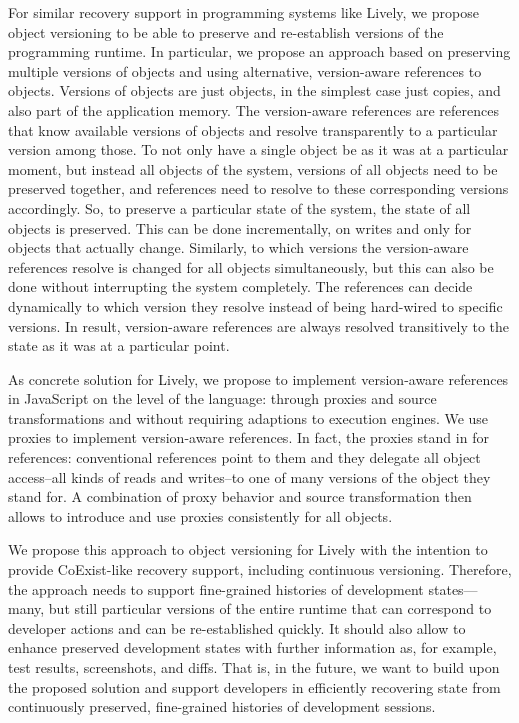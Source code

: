 For similar recovery support in programming systems like Lively, we propose object versioning to be able to preserve and re-establish versions of the programming runtime.
In particular, we propose an approach based on preserving multiple versions of objects and using alternative, version-aware references to objects.
Versions of objects are just objects, in the simplest case just copies, and also part of the application memory.
The version-aware references are references that know available versions of objects and resolve transparently to a particular version among those.
To not only have a single object be as it was at a particular moment, but instead all objects of the system, versions of all objects need to be preserved together, and references need to resolve to these corresponding versions accordingly.
So, to preserve a particular state of the system, the state of all objects is preserved.
This can be done incrementally, on writes and only for objects that actually change.
Similarly, to which versions the version-aware references resolve is changed for all objects simultaneously, but this can also be done without interrupting the system completely.
The references can decide dynamically to which version they resolve instead of being hard-wired to specific versions.
In result, version-aware references are always resolved transitively to the state as it was at a particular point.

As concrete solution for Lively, we propose to implement version-aware references in JavaScript on the level of the language: through proxies and source transformations and without requiring adaptions to execution engines.
We use proxies to implement version-aware references.
In fact, the proxies stand in for references: conventional references point to them and they delegate all object access--all kinds of reads and writes--to one of many versions of the object they stand for.
A combination of proxy behavior and source transformation then allows to introduce and use proxies consistently for all objects.

We propose this approach to object versioning for Lively with the intention to provide CoExist-like recovery support, including continuous versioning.
Therefore, the approach needs to support fine-grained histories of development states---many, but still particular versions of the entire runtime that can correspond to developer actions and can be re-established quickly.
It should also allow to enhance preserved development states with further information as, for example, test results, screenshots, and diffs.
That is, in the future, we want to build upon the proposed solution and support developers in efficiently recovering state from continuously preserved, fine-grained histories of development sessions.\\

